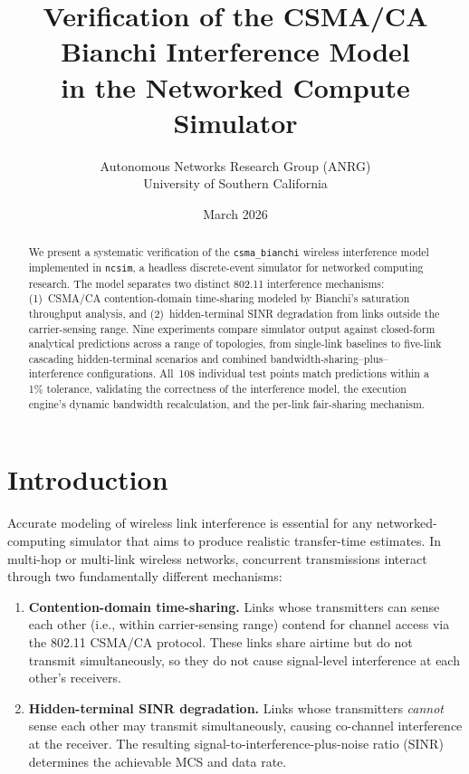 \documentclass[11pt,a4paper]{article}
\title{Verification of the CSMA/CA Bianchi Interference Model\\in the \ncsim{} Networked Compute Simulator}
\author{Autonomous Networks Research Group (ANRG)\\University of Southern California}
\date{March 2026}
\newcommand{\ncsim}{\texttt{ncsim}}
\begin{document}
\maketitle

\begin{abstract}
We present a systematic verification of the \texttt{csma\_bianchi} wireless interference model implemented in \ncsim{}, a headless discrete-event simulator for networked computing research. The model separates two distinct 802.11 interference mechanisms: (1)~CSMA/CA contention-domain time-sharing modeled by Bianchi's saturation throughput analysis, and (2)~hidden-terminal SINR degradation from links outside the carrier-sensing range. Nine experiments compare simulator output against closed-form analytical predictions across a range of topologies, from single-link baselines to five-link cascading hidden-terminal scenarios and combined bandwidth-sharing--plus--interference configurations. All~108 individual test points match predictions within a 1\% tolerance, validating the correctness of the interference model, the execution engine's dynamic bandwidth recalculation, and the per-link fair-sharing mechanism.
\end{abstract}

\section{Introduction}
\label{sec:intro}

Accurate modeling of wireless link interference is essential for any networked-computing simulator that aims to produce realistic transfer-time estimates. In multi-hop or multi-link wireless networks, concurrent transmissions interact through two fundamentally different mechanisms:

\begin{enumerate}    \item \textbf{Contention-domain time-sharing.} Links whose transmitters can sense each other (i.e., within carrier-sensing range) contend for channel access via the 802.11 CSMA/CA protocol. These links share airtime but do not transmit simultaneously, so they do not cause signal-level interference at each other's receivers.
    \item \textbf{Hidden-terminal SINR degradation.} Links whose transmitters \emph{cannot} sense each other may transmit simultaneously, causing co-channel interference at the receiver. The resulting signal-to-interference-plus-noise ratio (SINR) determines the achievable MCS and data rate.
\end{enumerate}
\end{document}
